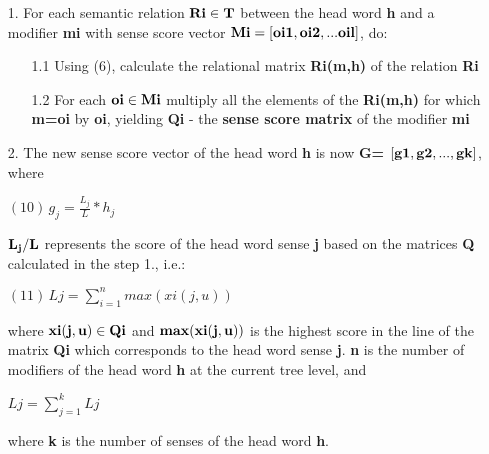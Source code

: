 \begin{enumerate}
\item[1.]
      For each semantic relation ${\bf Ri \in T}$ between the head word {\bf h} and a modifier {\bf mi} with sense score vector ${\bf Mi = [oi1,oi2,...oil]}$, do:
      \begin{enumerate}
      \item[1.1]
        Using (6), calculate the relational matrix {\bf Ri(m,h)} of the relation {\bf Ri}
      \item[1.2]
        For each ${\bf oi \in Mi}$ multiply all the elements of the {\bf Ri(m,h)} for which {\bf m=oi} by {\bf oi}, yielding {\bf Qi} - the {\bf sense score matrix} of the modifier {\bf mi}
      \end{enumerate}
\item[2.]
  The new sense score vector of the head word {\bf h} is now {\bf G= ${\bf [g1,g2,...,gk]}$}, where
  \begin{center}
    $ (10) \, \displaystyle g_{j} = \frac{L_{j}}{L} * h_{j} $
  \end{center}
${\bf L_{j}/L}$ represents the score of the head word sense {\bf j} based on the matrices {\bf Q} calculated in the step 1., i.e.:
\begin{center}
  $  (11)  \, \displaystyle Lj = \sum_{i=1}^{n} max(xi(j,u)) $
\end{center}
where ${\bf xi(j,u) \in Qi}$ and ${\bf max(xi(j,u))}$ is the highest score in the line of the matrix {\bf Qi} which corresponds to the head word sense {\bf j}. {\bf n} is the number of modifiers of the head word {\bf h} at the current tree level, and 
\begin{center}
  $ \displaystyle Lj = \sum_{j=1}^{k} Lj $
\end{center}
where {\bf k} is the number of senses of the head word {\bf h}.
\end{enumerate}


